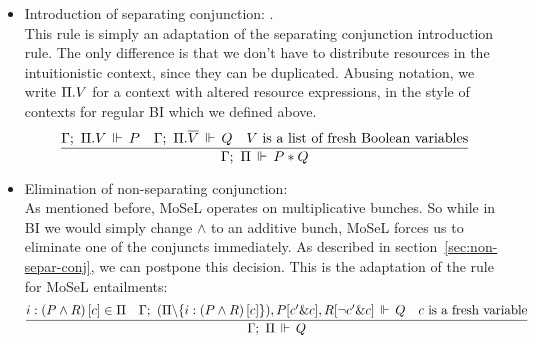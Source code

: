 \begin{itemize}
\item Introduction of separating conjunction: .\\
  This rule is simply an adaptation of the separating conjunction introduction rule.
  The only difference is that we don't have to distribute resources in the intuitionistic context, since they can be duplicated.
  Abusing notation, we write \(\Pi . V\) for a context with altered resource expressions, in the style of contexts for regular BI which we defined above.
  \[
    \infer{\entailsD P * Q}
          {\entails {\IntuD} {\SpatD . V} P &
           \entails {\IntuD} {\SpatD . \overline{V}} Q &
           V \text{ is a list of fresh Boolean variables}}
   \]
 \item Elimination of non-separating conjunction: \\
   As mentioned before, MoSeL operates on multiplicative bunches.
   So while in BI we would simply change \(\wedge\) to an additive bunch, MoSeL forces us to eliminate one of the conjuncts immediately.
   As described in section~\ref{sec:non-separ-conj}, we can postpone this decision.
   This is the adaptation of the rule for MoSeL entailments:
  \[
  \infer{\entailsD Q}
        {i : \left(P \wedge R\right)[c] \in \SpatD &
         \entails {\IntuD}
                  {(\SpatD \backslash \{i : \left(P \wedge R\right)[c]\}), P[c' \& c], R [\neg c' \& c]}
                  {Q} &
         c \text{ is a fresh variable}}
  \]





\end{itemize}
